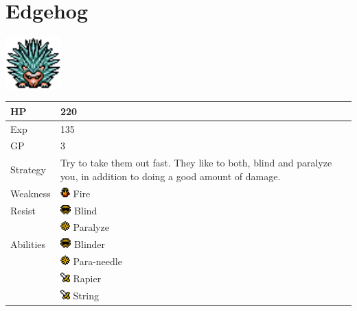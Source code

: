 \section{Edgehog}
\label{monster:edgehog}

\includegraphics[height=2cm,keepaspectratio]{./resources/monster/edgehog}

\begin{longtable}{ l p{9cm} }
	HP
	& 220
\\ \hline
	Exp
	& 135
\\ \hline
	GP
	& 3
\\ \hline
	Strategy
	& Try to take them out fast. They like to both, blind and paralyze you, in addition to doing a good amount of damage.
\\ \hline
	Weakness
	& \includegraphics[height=1em,keepaspectratio]{./resources/effects/fire} Fire
\\ \hline
	Resist
	& \includegraphics[height=1em,keepaspectratio]{./resources/effects/blind} Blind \\
	& \includegraphics[height=1em,keepaspectratio]{./resources/effects/paralyze} Paralyze
\\ \hline
	Abilities
	& \includegraphics[height=1em,keepaspectratio]{./resources/effects/blind} Blinder \\
	& \includegraphics[height=1em,keepaspectratio]{./resources/effects/paralyze} Para-needle \\
	& \includegraphics[height=1em,keepaspectratio]{./resources/effects/damage} Rapier \\
	& \includegraphics[height=1em,keepaspectratio]{./resources/effects/damage} String
\end{longtable}
